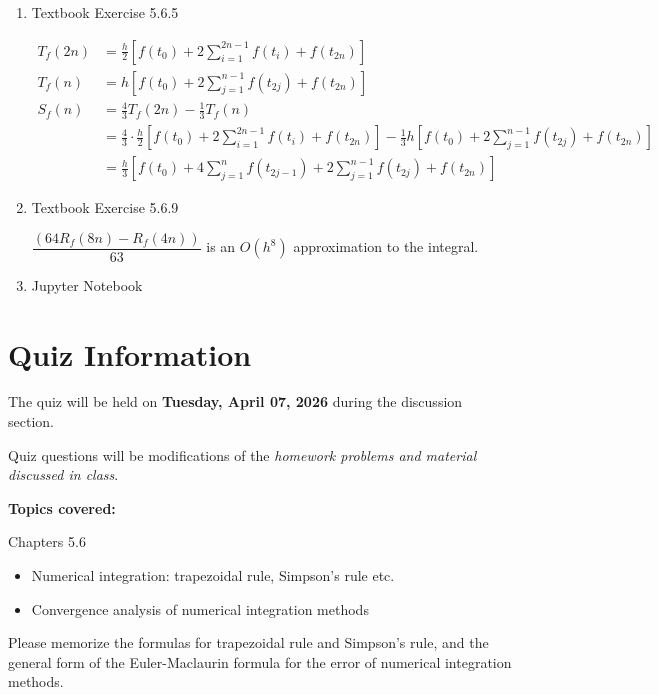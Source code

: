 \documentclass[reqno, answers]{exam}
\begin{document}
\begin{enumerate}
    \item Textbook Exercise 5.6.5

          \begin{solution}
            \begin{align*}
                T_f(2n) &= \frac{h}{2} \left[ f(t_0) + 2\sum_{i=1}^{2n-1} f(t_i) + f(t_{2n}) \right] \\[1em]
                T_f(n)  &= h \left[ f(t_0) + 2\sum_{j=1}^{n-1} f(t_{2j}) + f(t_{2n}) \right] \\[1em]
                S_f(n)  &= \frac{4}{3}T_f(2n) - \frac{1}{3}T_f(n) \\
                        &= \frac{4}{3} \cdot \frac{h}{2} \left[ f(t_0) + 2\sum_{i=1}^{2n-1} f(t_i) + f(t_{2n}) \right] - \frac{1}{3} h \left[ f(t_0) + 2\sum_{j=1}^{n-1} f(t_{2j}) + f(t_{2n}) \right] \\
                        &= \frac{h}{3} \left[ f(t_0) + 4\sum_{j=1}^{n} f(t_{2j-1}) + 2\sum_{j=1}^{n-1} f(t_{2j}) + f(t_{2n}) \right]
            \end{align*}
          \end{solution}
    \item Textbook Exercise 5.6.9
          \begin{solution}
              $\dfrac{\left( 64 R_f(8n) - R_f(4n) \right)}{63}$ is an $O(h^8)$ approximation to the integral.
          \end{solution}

    \item Jupyter Notebook

\end{enumerate}


\section*{Quiz Information}

The quiz will be held on {\bf Tuesday, April 07, 2026} during the discussion section.

Quiz questions will be modifications of the {\it homework problems and material discussed in class}.

\textbf{Topics covered:}

Chapters 5.6

\begin{itemize}
    \item Numerical integration: trapezoidal rule, Simpson's rule etc.
    \item Convergence analysis of numerical integration methods
\end{itemize}

Please memorize the formulas for trapezoidal rule and Simpson's rule, and the general form of the Euler-Maclaurin formula for the error of numerical integration methods.
\end{document}
